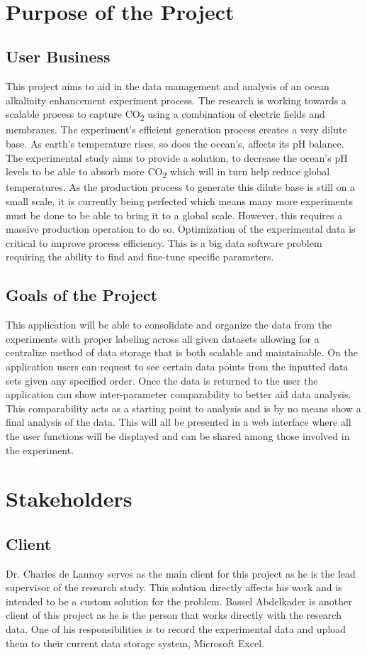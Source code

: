 \documentclass[12pt]{article}
\begin{document}
~\newpage
\section{Purpose of the Project}
\subsection{User Business}
This project aims to aid in the data management and analysis of an ocean
alkalinity enhancement experiment process. The research is working towards a
scalable process to capture CO\textsubscript{2} using a combination of electric
fields and membranes. The experiment's efficient generation process creates a
very dilute base. As earth’s temperature rises, so does the ocean’s, affects its
pH balance. The experimental study aims to provide a solution, to decrease the
ocean's pH levels to be able to absorb more CO\textsubscript{2} which will in
turn help reduce global temperatures.  As the production process to generate
this dilute base is still on a small scale, it is currently being perfected
which means many more experiments must be done to be able to bring it to a
global scale. However, this requires a massive production operation to do so.
Optimization of the experimental data is critical to improve process efficiency.
This is a big data software problem requiring the ability to find and fine-tune
specific parameters. 
\subsection{Goals of the Project}
This application will be able to consolidate and organize the data from the
experiments with proper labeling across all given datasets allowing for a
centralize method of data storage that is both scalable and maintainable. On the
application users can request to see certain data points from the inputted data
sets given any specified order. Once the data is returned to the user the
application can show inter-parameter comparability to better aid data analysis.
This comparability acts as a starting point to analysis and is by no means show
a final analysis of the data. This will all be presented in a web interface
where all the user functions will be displayed and can be shared among those
involved in the experiment.   
\section{Stakeholders}

\subsection{Client}
Dr. Charles de Lannoy serves as the main client for this project as he is the
lead supervisor of the research study. This solution directly affects his work and
is intended to be a custom solution for the problem. Bassel Abdelkader is
another client of this project as he is the person that works directly with the
research data. One of his responsibilities is to record the experimental data and
upload them to their current data storage system, Microsoft Excel. 
\end{document}

